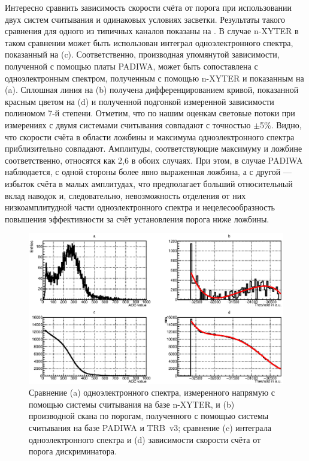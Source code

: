 Интересно сравнить зависимость скорости счёта от порога при использовании двух систем считывания и одинаковых условиях засветки. Результаты такого сравнения для одного из типичных каналов показаны на . В случае n-XYTER в таком сравнении может быть использован интеграл одноэлектронного спектра, показанный на (c). Соответственно, производная упомянутой зависимости, полученной с помощью платы PADIWA, может быть сопоставлена с одноэлектронным спектром, полученным с помощью n-XYTER и показанным на (a). Сплошная линия на (b) получена дифференцированием кривой, показанной красным цветом на (d) и полученной подгонкой измеренной зависимости полиномом 7-й степени. Отметим, что по нашим оценкам световые потоки при измерениях с двумя системами считывания совпадают с точностью $\pm$5\%. Видно, что скорости счёта в области ложбины и максимума одноэлектронного спектра приблизительно совпадают. Амплитуды, соответствующие максимуму и ложбине соответственно, относятся как 2,6 в обоих случаях. При этом, в случае PADIWA наблюдается, с одной стороны более явно выраженная ложбина, а с другой --- избыток счёта в малых амплитудах, что предполагает больший относительный вклад наводок и, следовательно, невозможность отделения от них низкоамплитудной части одноэлектронного спектра и нецелесообразность повышения эффективности за счёт установления порога ниже ложбины.

\begin{figure}[H]
\centering
\includegraphics[width=1.0\textwidth]{pictures/32_Blackboard_4feb.eps}
\caption{Сравнение (a) одноэлектронного спектра, измеренного напрямую с помощью системы считывания на базе n-XYTER, и (b) производной скана по порогам, полученного с помощью системы считывания на базе PADIWA и TRB~v3; сравнение (c) интеграла одноэлектронного спектра и (d) зависимости скорости счёта от порога дискриминатора.}
\label{fig:Blackboard}
\end{figure}
